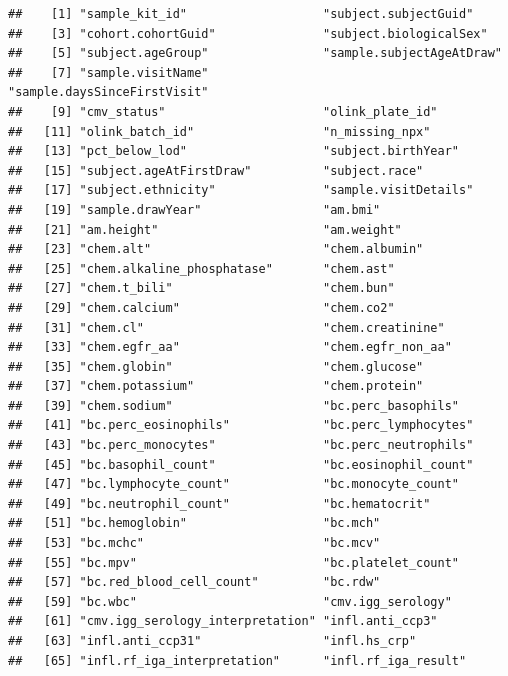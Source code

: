\documentclass[
]{article}
\begin{document}
\begin{verbatim}
##    [1] "sample_kit_id"                   "subject.subjectGuid"            
##    [3] "cohort.cohortGuid"               "subject.biologicalSex"          
##    [5] "subject.ageGroup"                "sample.subjectAgeAtDraw"        
##    [7] "sample.visitName"                "sample.daysSinceFirstVisit"     
##    [9] "cmv_status"                      "olink_plate_id"                 
##   [11] "olink_batch_id"                  "n_missing_npx"                  
##   [13] "pct_below_lod"                   "subject.birthYear"              
##   [15] "subject.ageAtFirstDraw"          "subject.race"                   
##   [17] "subject.ethnicity"               "sample.visitDetails"            
##   [19] "sample.drawYear"                 "am.bmi"                         
##   [21] "am.height"                       "am.weight"                      
##   [23] "chem.alt"                        "chem.albumin"                   
##   [25] "chem.alkaline_phosphatase"       "chem.ast"                       
##   [27] "chem.t_bili"                     "chem.bun"                       
##   [29] "chem.calcium"                    "chem.co2"                       
##   [31] "chem.cl"                         "chem.creatinine"                
##   [33] "chem.egfr_aa"                    "chem.egfr_non_aa"               
##   [35] "chem.globin"                     "chem.glucose"                   
##   [37] "chem.potassium"                  "chem.protein"                   
##   [39] "chem.sodium"                     "bc.perc_basophils"              
##   [41] "bc.perc_eosinophils"             "bc.perc_lymphocytes"            
##   [43] "bc.perc_monocytes"               "bc.perc_neutrophils"            
##   [45] "bc.basophil_count"               "bc.eosinophil_count"            
##   [47] "bc.lymphocyte_count"             "bc.monocyte_count"              
##   [49] "bc.neutrophil_count"             "bc.hematocrit"                  
##   [51] "bc.hemoglobin"                   "bc.mch"                         
##   [53] "bc.mchc"                         "bc.mcv"                         
##   [55] "bc.mpv"                          "bc.platelet_count"              
##   [57] "bc.red_blood_cell_count"         "bc.rdw"                         
##   [59] "bc.wbc"                          "cmv.igg_serology"               
##   [61] "cmv.igg_serology_interpretation" "infl.anti_ccp3"                 
##   [63] "infl.anti_ccp31"                 "infl.hs_crp"                    
##   [65] "infl.rf_iga_interpretation"      "infl.rf_iga_result"             

\end{verbatim}
\end{document}
